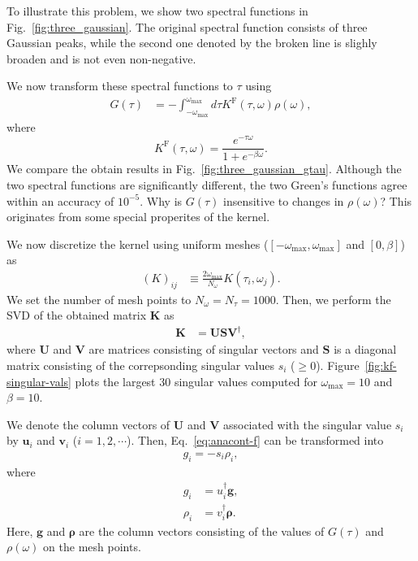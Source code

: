 \documentclass[submission, LectureNotes]{SciPost}
\newcommand{\bU}{\bm{U}}
\newcommand{\bV}{\bm{V}}
\newcommand{\bu}{\bm{u}}
\newcommand{\bv}{\bm{v}}
\newcommand{\bK}{K}
\newcommand{\wmax}{\ensuremath{{\omega_\mathrm{max}}}}
\begin{document}
To illustrate this problem, we show two spectral functions in Fig.~\ref{fig:three_gaussian}.
The original spectral function consists of three Gaussian peaks,
while the second one denoted by the broken line is slighly broaden and is not even non-negative.

We now transform these spectral functions to $\tau$ using
\begin{align}
    G(\tau) &= - \int_{-\omega_\mathrm{max}}^{\omega_\mathrm{max}}d\tau K^\mathrm{F}(\tau, \omega) \rho(\omega),\label{eq:anacont-f}
\end{align}
where
$$
K^\mathrm{F}(\tau, \omega) = \frac{e^{-\tau\omega}}{1+e^{-\beta\omega}}.
$$
We compare the obtain results in Fig.~\ref{fig:three_gaussian_gtau}.
Although the two spectral functions are significantly different, 
the two Green's functions agree within an accuracy of $10^{-5}$.
Why is $G(\tau)$ insensitive to changes in $\rho(\omega)$?
This originates from some special properites of the kernel.

We now discretize the kernel using uniform meshes
($[-\omega_\mathrm{max}, \omega_\mathrm{max}]$ and $[0,\beta]$) as
\begin{align}
   (\bK)_{ij} &\equiv \frac{2\wmax}{N_\omega}K(\tau_i, \omega_j).
\end{align}
We set the number of mesh points to $N_\omega = N_\tau=1000$.
Then, we perform the SVD of the obtained matrix $\boldsymbol{K}$ as
\begin{align}
    \boldsymbol{K} &= \boldsymbol{U} \boldsymbol{S} \boldsymbol{V}^\dagger,
\end{align}
where $\boldsymbol{U}$ and $\boldsymbol{V}$ are matrices consisting of singular vectors
and $\boldsymbol{S}$ is a diagonal matrix consisting of the correpsonding singular values $s_i$ ($\ge 0$).
Figure~\ref{fig:kf-singular-vals} plots the largest 30 singular values computed for $\wmax=10$ and $\beta=10$.

We denote the column vectors of $\bU$ and $\bV$ associated with the singular value $s_i$
by $\bu_i$ and $\bv_i$ ($i=1,2,\cdots$).
Then, Eq.~\eqref{eq:anacont-f} can be transformed into
\begin{align}
    g_i = - s_i \rho_i,
\end{align}
where
\begin{align}
    g_i    &= u_i^\dagger \bm{g},\\
    \rho_i &= v_i^\dagger \bm{\rho}.
\end{align}
Here, $\bm{g}$ and $\bm{\rho}$ are the column vectors consisting of the values of $G(\tau)$ and $\rho(\omega)$ on the mesh points.
\end{document}
